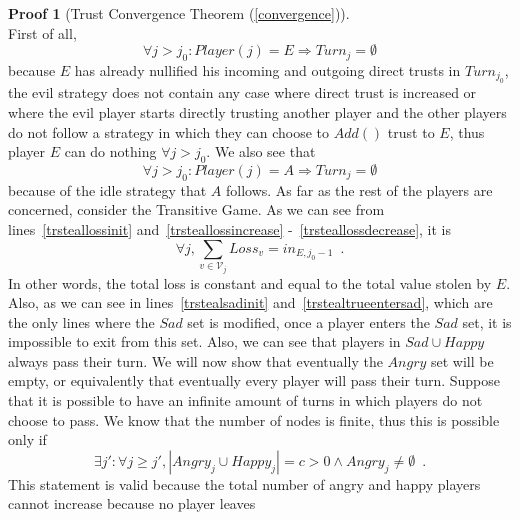 \documentclass[11pt]{llncs}
\theoremstyle{definition}
\newtheorem{sepproof}{Proof}
\begin{document}
    \begin{sepproof}[Trust Convergence Theorem (\ref{convergence})] \ \\
    \label{convergenceproof}
       First of all,
       \begin{equation*}
          \forall j > j_0 : Player\left(j\right) = E \Rightarrow Turn_j = \emptyset
       \end{equation*}
        because $E$ has already nullified his incoming and outgoing direct trusts in $Turn_{j_0}$, the evil strategy does not
       contain any case where direct trust is increased or where the evil player starts directly trusting another player and
       the other players do not follow a strategy in which they can choose to $Add\left(\right)$ trust to $E$, thus player
       $E$ can do nothing $\forall j > j_0$. We also see that
       \begin{equation*}
          \forall j > j_0 : Player(j) = A \Rightarrow Turn_j = \emptyset
       \end{equation*}
       because of the idle strategy that $A$ follows. As far as the rest of the players are concerned, consider the
       Transitive Game. As we can see from lines~\ref{trsteallossinit} and~\ref{trsteallossincrease}
       -~\ref{trsteallossdecrease}, it is
       \begin{equation*}
          \forall j, \sum\limits_{v \in \mathcal{V}_j}Loss_v = in_{E, j_0-1} \enspace.
       \end{equation*}
       In other words, the total loss is constant and equal to the total value stolen by $E$. Also, as we can see in
       lines~\ref{trstealsadinit} and~\ref{trstealtrueentersad}, which are the only lines where the $Sad$ set is modified,
       once a player enters the $Sad$ set, it is impossible to exit from this set. Also, we can see that players in $Sad
       \cup Happy$ always pass their turn. We will now show that eventually the $Angry$ set will be empty, or equivalently
       that eventually every player will pass their turn. Suppose that it is possible to have an infinite amount of turns
       in which players do not choose to pass. We know that the number of nodes is finite, thus this is possible only if
       \begin{equation*}
          \exists j': \forall j \geq j', |Angry_j \cup Happy_j| = c > 0 \wedge Angry_j \neq \emptyset \enspace.
       \end{equation*}
       This statement is valid because the total number of angry and happy players cannot increase because no player leaves

\end{sepproof}
\end{document}
